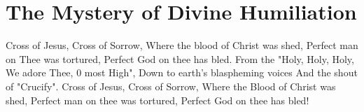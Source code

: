 \starttocol
\chapter{The Mystery of Divine Humiliation}
\nexttocol
\hfill{\it }
\stoptocol
\starttocol
\startlines
{\sc Cross} of Jesus, Cross of Sorrow,
Where the blood of Christ was shed,
Perfect man on Thee was tortured,
Perfect God on thee has bled.
From the "Holy, Holy, Holy,
We adore Thee, 0 most High",
Down to earth's blaspheming voices
And the shout of "Crucify".
Cross of Jesus, Cross of Sorrow,
Where the Blood of Christ was shed,
Perfect man on thee was tortured,
Perfect God on thee has bled!
\stoplines
\nexttocol

\stoptocol
